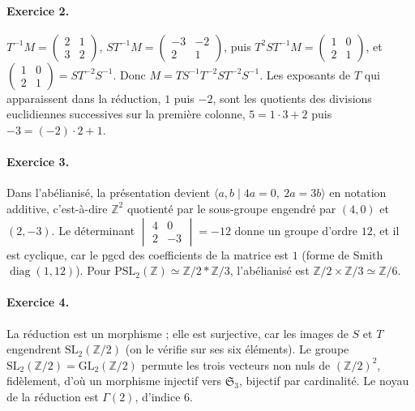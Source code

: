 \documentclass[11pt,a4paper]{article}
\theoremstyle{plain}
\theoremstyle{definition}
\theoremstyle{remark}
\newcommand{\Z}{\mathbb{Z}}
\newcommand{\SL}{\mathrm{SL}}
\newcommand{\GL}{\mathrm{GL}}
\newcommand{\PSL}{\mathrm{PSL}}
\begin{document}
\paragraph{Exercice 2.} $T^{-1}M=\begin{pmatrix}2&1\\3&2\end{pmatrix}$, $ST^{-1}M=\begin{pmatrix}-3&-2\\2&1\end{pmatrix}$, puis $T^{2}ST^{-1}M=\begin{pmatrix}1&0\\2&1\end{pmatrix}$, et $\begin{pmatrix}1&0\\2&1\end{pmatrix}=ST^{-2}S^{-1}$. Donc $M=TS^{-1}T^{-2}ST^{-2}S^{-1}$. Les exposants de $T$ qui apparaissent dans la réduction, $1$ puis $-2$, sont les quotients des divisions euclidiennes successives sur la première colonne, $5=1\cdot3+2$ puis $-3=(-2)\cdot2+1$.

\paragraph{Exercice 3.} Dans l'abélianisé, la présentation devient $\langle a,b\mid 4a=0,\ 2a=3b\rangle$ en notation additive, c'est-à-dire $\Z^2$ quotienté par le sous-groupe engendré par $(4,0)$ et $(2,-3)$. Le déterminant $\begin{vmatrix}4&0\\2&-3\end{vmatrix}=-12$ donne un groupe d'ordre $12$, et il est cyclique, car le pgcd des coefficients de la matrice est $1$ (forme de Smith $\operatorname{diag}(1,12)$). Pour $\PSL_2(\Z)\simeq\Z/2*\Z/3$, l'abélianisé est $\Z/2\times\Z/3\simeq\Z/6$.

\paragraph{Exercice 4.} La réduction est un morphisme ; elle est surjective, car les images de $S$ et $T$ engendrent $\SL_2(\Z/2)$ (on le vérifie sur ses six éléments). Le groupe $\SL_2(\Z/2)=\GL_2(\Z/2)$ permute les trois vecteurs non nuls de $(\Z/2)^2$, fidèlement, d'où un morphisme injectif vers $\mathfrak S_3$, bijectif par cardinalité. Le noyau de la réduction est $\Gamma(2)$, d'indice $6$.
\end{document}
